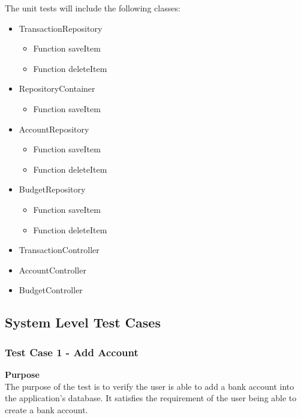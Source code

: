 \documentclass[12pt]{article}
\begin{document}
\setlength{\parskip}{0.8mm}
The unit tests will include the following classes:
\begin {itemize}
	\item TransactionRepository
	\begin {itemize}
		\item Function saveItem
		\item Function deleteItem
	\end {itemize}
	\item RepositoryContainer
	\begin {itemize}
		\item Function saveItem
	\end {itemize}
	\item AccountRepository
	\begin {itemize}
		\item Function saveItem
		\item Function deleteItem
	\end {itemize}
	\item BudgetRepository
	\begin {itemize}
		\item Function saveItem
		\item Function deleteItem
	\end {itemize}
	\item TransactionController
	\item AccountController
	\item BudgetController
\end {itemize}



\clearpage
\subsection{System Level Test Cases}



\subsubsection {Test Case 1 - Add Account} \label{TC-1}

\noindent
{\bf Purpose}\\
The purpose of the test is to verify the user is able to add a bank account into the application's database.
It satisfies the requirement of the user being able to create a bank account.\\
\end{document}
